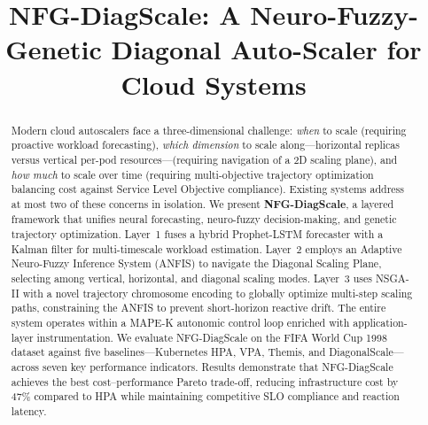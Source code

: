 \documentclass[conference]{IEEEtran}
\begin{document}
\title{NFG-DiagScale: A Neuro-Fuzzy-Genetic Diagonal Auto-Scaler for Cloud Systems}

\author{
\and
{}
}

\maketitle

\begin{abstract}
Modern cloud autoscalers face a three-dimensional challenge: \textit{when} to scale (requiring proactive workload forecasting), \textit{which dimension} to scale along---horizontal replicas versus vertical per-pod resources---(requiring navigation of a 2D scaling plane), and \textit{how much} to scale over time (requiring multi-objective trajectory optimization balancing cost against Service Level Objective compliance). Existing systems address at most two of these concerns in isolation. We present \textbf{NFG-DiagScale}, a layered framework that unifies neural forecasting, neuro-fuzzy decision-making, and genetic trajectory optimization. Layer~1 fuses a hybrid Prophet-LSTM forecaster with a Kalman filter for multi-timescale workload estimation. Layer~2 employs an Adaptive Neuro-Fuzzy Inference System (ANFIS) to navigate the Diagonal Scaling Plane, selecting among vertical, horizontal, and diagonal scaling modes. Layer~3 uses NSGA-II with a novel trajectory chromosome encoding to globally optimize multi-step scaling paths, constraining the ANFIS to prevent short-horizon reactive drift. The entire system operates within a MAPE-K autonomic control loop enriched with application-layer instrumentation. We evaluate NFG-DiagScale on the FIFA World Cup 1998 dataset against five baselines---Kubernetes HPA, VPA, Themis, and DiagonalScale---across seven key performance indicators. Results demonstrate that NFG-DiagScale achieves the best cost--performance Pareto trade-off, reducing infrastructure cost by 47\% compared to HPA while maintaining competitive SLO compliance and reaction latency.
\end{abstract}
\end{document}
